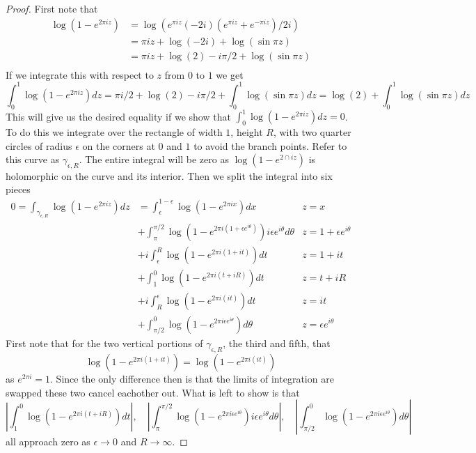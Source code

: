 \documentclass[10pt]{article}
\theoremstyle{remark}
\theoremstyle{remark}
\begin{document}
\begin{proof}
  First note that
  \begin{align*}
    \log(1-e^{2\pi iz}) &=\log(e^{\pi iz}(-2i)(e^{\pi iz}+e^{-\pi iz})/2i)\\
                      &=\pi iz + \log(-2i)+\log(\sin\pi z)\\
                      &= \pi iz + \log(2)-i\pi/2+\log(\sin\pi z)\\
  \end{align*}
  If we integrate this with respect to $z$ from $0$ to $1$ we get
  \[
    \int_0^1\log(1-e^{2\pi iz})dz=\pi i/2+\log(2)-i\pi/2+\int_0^1\log(\sin\pi z) dz = \log(2)+\int_0^1\log(\sin\pi z) dz
  \]
  This will give us the desired equality if we show that $\int_0^1\log(1-e^{2\pi iz})dz=0$. To do this
  we integrate over the rectangle of width $1$, height $R$, with two quarter circles of radius $\epsilon$
  on the corners at $0$ and $1$ to avoid the branch points. Refer to this curve as $\gamma_{\epsilon,R}$. The
  entire integral will be zero as $\log(1-e^{2\cap iz})$ is holomorphic on the curve and its interior.
  Then we split the integral into six pieces
  \begin{align*}
    0 = \int_{\gamma_{\epsilon,R}}\log(1-e^{2\pi iz})dz &= \int_\epsilon^{1-\epsilon}\log(1-e^{2\pi ix}) dx & z=x\\
                                                     &+ \int_{\pi}^{\pi/2}\log(1-e^{2\pi i(1+\epsilon e^{i\theta})})i\epsilon e^{i\theta}d\theta & z=1+\epsilon e^{i\theta}\\
                                                     &+ i\int_\epsilon^R\log(1-e^{2\pi i(1+it)})dt & z=1+it\\
                                                     &+ \int_1^0\log(1-e^{2\pi i(t+iR)})dt & z=t+iR\\
                                                     &+ i\int_R^\epsilon\log(1-e^{2\pi i(it)}) dt & z=it\\
                                                     &+ \int_{\pi/2}^0\log(1-e^{2\pi i \epsilon e^{i\theta}}) d\theta & z=\epsilon e^{i\theta}
  \end{align*}
  First note that for the two vertical portions of $\gamma_{\epsilon,R}$, the third and fifth, that
  \[
    \log(1-e^{2\pi i(1+it)}) = \log(1-e^{2\pi i(it)})
  \]
  as $e^{2\pi i }=1$. Since the only difference then is that the limits of integration are swapped
  these two cancel eachother out. What is left to show is that
  \[
    \left|\int_1^0\log(1-e^{2\pi i(t+iR)})dt\right|,\quad\left|\int_{\pi}^{\pi/2}\log(1-e^{2\pi i\epsilon e^{i\theta}})i\epsilon e^{i\theta}d\theta\right|,\quad \left|\int_{\pi/2}^0\log(1-e^{2\pi i \epsilon e^{i\theta}}) d\theta\right|
  \]
  all approach zero as $\epsilon\rightarrow 0 $ and $R\rightarrow\infty$.


\end{proof}
\end{document}
